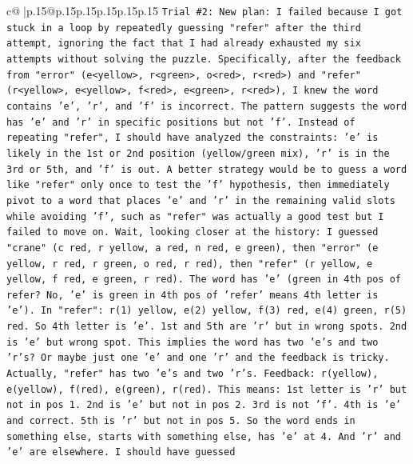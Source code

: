 \documentclass{article}
\begin{document}
{\begin{supertabular}{c@{$\;$}|p{.15\linewidth}@{}p{.15\linewidth}p{.15\linewidth}p{.15\linewidth}p{.15\linewidth}p{.15\linewidth}}
{{{\texttt{Trial \#2: New plan: I failed because I got stuck in a loop by repeatedly guessing "refer" after the third attempt, ignoring the fact that I had already exhausted my six attempts without solving the puzzle. Specifically, after the feedback from "error" (e<yellow>, r<green>, o<red>, r<red>) and "refer" (r<yellow>, e<yellow>, f<red>, e<green>, r<red>), I knew the word contains 'e', 'r', and 'f' is incorrect. The pattern suggests the word has 'e' and 'r' in specific positions but not 'f'. Instead of repeating "refer", I should have analyzed the constraints: 'e' is likely in the 1st or 2nd position (yellow/green mix), 'r' is in the 3rd or 5th, and 'f' is out. A better strategy would be to guess a word like "refer" only once to test the 'f' hypothesis, then immediately pivot to a word that places 'e' and 'r' in the remaining valid slots while avoiding 'f', such as "refer" was actually a good test but I failed to move on. Wait, looking closer at the history: I guessed "crane" (c red, r yellow, a red, n red, e green), then "error" (e yellow, r red, r green, o red, r red), then "refer" (r yellow, e yellow, f red, e green, r red). The word has 'e' (green in 4th pos of refer? No, 'e' is green in 4th pos of 'refer' means 4th letter is 'e'). In "refer": r(1) yellow, e(2) yellow, f(3) red, e(4) green, r(5) red. So 4th letter is 'e'. 1st and 5th are 'r' but in wrong spots. 2nd is 'e' but wrong spot. This implies the word has two 'e's and two 'r's? Or maybe just one 'e' and one 'r' and the feedback is tricky. Actually, "refer" has two 'e's and two 'r's. Feedback: r(yellow), e(yellow), f(red), e(green), r(red). This means: 1st letter is 'r' but not in pos 1. 2nd is 'e' but not in pos 2. 3rd is not 'f'. 4th is 'e' and correct. 5th is 'r' but not in pos 5. So the word ends in something else, starts with something else, has 'e' at 4. And 'r' and 'e' are elsewhere. I should have guessed} \\
\\ 
}}}
\end{supertabular}}
\end{document}
